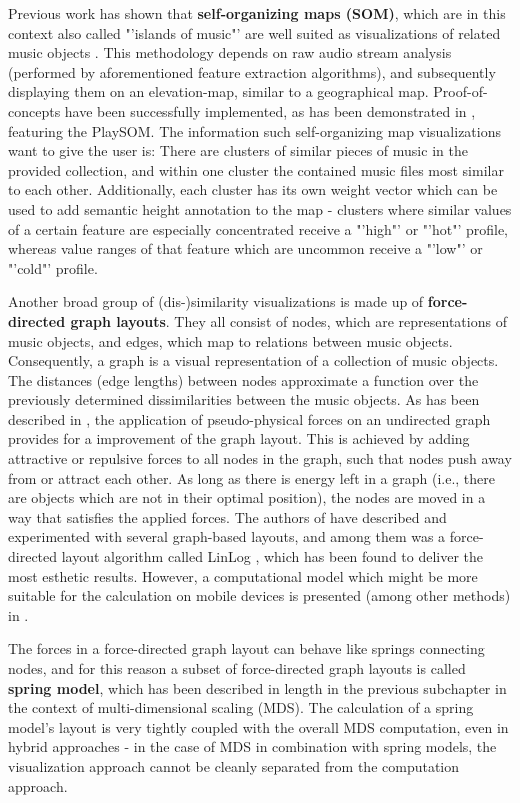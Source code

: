 Previous work has shown that \textbf{self-organizing maps (SOM)}, which are in this context also called "'islands of music"' are well suited as visualizations of related music objects \cite{Cooper:2006:VAM}. This methodology depends on raw audio stream analysis (performed by aforementioned feature extraction algorithms), and subsequently displaying them on an elevation-map, similar to a geographical map. Proof-of-concepts have been successfully implemented, as has been demonstrated in \cite{NeuDitRau_05ismir}, featuring the PlaySOM. The information such self-organizing map visualizations want to give the user is: There are clusters of similar pieces of music in the provided collection, and within one cluster the contained music files most similar to each other. Additionally, each cluster has its own weight vector which can be used to add semantic height annotation to the map - clusters where similar values of a certain feature are especially concentrated receive a "'high"' or "'hot"' profile, whereas value ranges of that feature which are uncommon receive a "'low"' or "'cold"' profile.

Another broad group of (dis-)similarity visualizations is made up of \textbf{force-directed graph layouts}. They all consist of nodes, which are representations of music objects, and edges, which map to relations between music objects. Consequently, a graph is a visual representation of a collection of music objects. The distances (edge lengths) between nodes approximate a function over the previously determined dissimilarities between the music objects.
As has been described in \cite{gansner:1998}, the application of pseudo-physical forces on an undirected graph provides for a improvement of the graph layout. This is achieved by adding attractive or repulsive forces to all nodes in the graph, such that nodes push away from or attract each other. As long as there is energy left in a graph (i.e., there are objects which are not in their optimal position), the nodes are moved in a way that satisfies the applied forces. The authors of \cite{Muelder:2010fk} have described and experimented with several graph-based layouts, and among them was a force-directed layout algorithm called LinLog \cite{noack:2003}, which has been found to deliver the most esthetic results. However, a computational model which might be more suitable for the calculation on mobile devices is presented (among other methods) in \cite{Kobourov04}.

The forces in a force-directed graph layout can behave like springs connecting nodes, and for this reason a subset of force-directed graph layouts is called \textbf{spring model}, which has been described in length in the previous subchapter in the context of multi-dimensional scaling (MDS). The calculation of a spring model's layout is very tightly coupled with the overall MDS computation, even in hybrid approaches \cite{Morrison:2003:FMS} - in the case of MDS in combination with spring models, the visualization approach cannot be cleanly separated from the computation approach.

